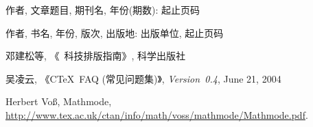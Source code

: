 \documentclass{WHUMaster}   %
\begin{document}












\cleardoublepage{}
{}
\begin{thebibliography}{000}

   作者, 文章题目, 期刊名, 年份(期数): 起止页码

   作者, 书名, 年份, 版次, 出版地: 出版单位, 起止页码

   邓建松等, 《\LaTeXe~科技排版指南》, 科学出版社

   吴凌云, 《CTeX~FAQ (常见问题集)》, \textit{Version~0.4}, June 21, 2004

   Herbert Vo\ss, Mathmode, \url{http://www.tex.ac.uk/ctan/info/math/voss/mathmode/Mathmode.pdf}.

\end{thebibliography}



\backmatter
\cleardoublepage
\end{document}
